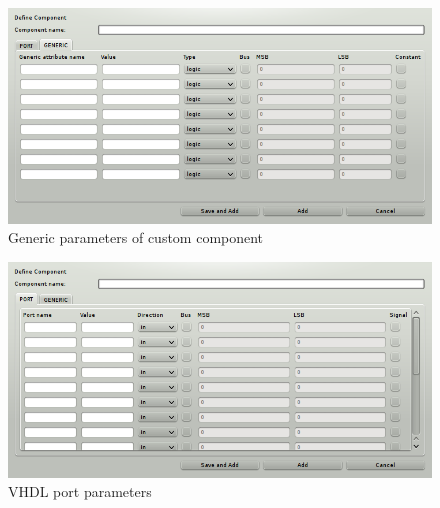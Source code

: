     \begin{figure}[h]
        \centering
        \includegraphics[width=.7\textwidth]{img/VHDL_create_generic.png}
        \caption{Generic parameters of custom component}
    \end{figure}

    \begin{figure}[h]
        \centering
        \includegraphics[width=.7\textwidth]{img/VHDL_create_component.png}
        \caption{VHDL port parameters}
    \end{figure}

